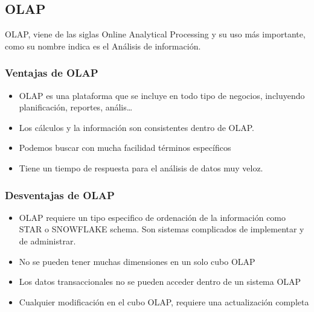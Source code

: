 \documentclass[a4paper 
,twoside
]{article}
\begin{document}
  \subsection{OLAP}

    OLAP, viene de las siglas Online Analytical Processing y su uso más importante, como su nombre indica es el Análisis de información.
    
    \subsubsection{Ventajas de OLAP}
    \begin{itemize}
      \item   OLAP es una plataforma que se incluye en todo tipo de negocios, incluyendo planificación, reportes, anális\dots
      \item Los cálculos y la información son consistentes dentro de OLAP.
      \item Podemos buscar con mucha facilidad términos específicos
      \item Tiene un tiempo de respuesta para el análisis de datos muy veloz.
    \end{itemize}

    \subsubsection{Desventajas de OLAP}
    \begin{itemize}
      \item OLAP requiere un tipo especifico de ordenación de la información como STAR o SNOWFLAKE schema. Son sistemas complicados de implementar y de administrar.
      \item No se pueden tener muchas dimensiones en un solo cubo OLAP
      \item Los datos transaccionales no se pueden acceder dentro de un sistema OLAP
      \item Cualquier modificación en el cubo OLAP, requiere una actualización completa
    \end{itemize}
\end{document}
